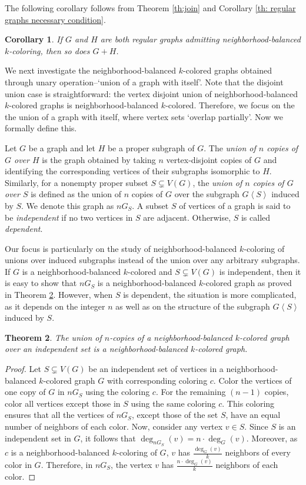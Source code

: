 \documentclass[12pt]{article}
\newtheorem{theorem}{Theorem}[section]
\newtheorem{corollary}[theorem]{Corollary}
\def\ni{\noindent}
\newcommand{\nbc}{neighborhood-balanced $k$-coloring\xspace}
\newcommand{\nbcd}{neighborhood-balanced $k$-colored\xspace}
\begin{document}
\ni The following corollary follows from Theorem \ref{th:join} and Corollary \ref{th: regular graphs necessary condition}.

\begin{corollary}
    If $G$ and $H$ are both regular graphs admitting \nbc, then so does $G+H$.
\end{corollary}

We next investigate the \nbcd graphs obtained through unary operation--`union of a graph with itself'.
Note that the disjoint union case is straightforward: the vertex disjoint union of \nbcd graphs is \nbcd.
Therefore, we focus on the the union of a graph with itself, where vertex sets `overlap partially'.
Now we formally define this.
\par
Let $G$ be a graph and let $H$ be a proper subgraph of $G$. 
The {\it union of $n$ copies of $G$ over $H$} is the graph obtained by taking $n$ vertex-disjoint copies of $G$ and identifying the corresponding vertices of their subgraphs isomorphic to $H$.
Similarly, for a nonempty proper subset $S \subsetneq V(G)$, the {\it union of $n$ copies of $G$ over $S$} is defined as the union of $n$ copies of $G$ over the subgraph $G\left< S \right>$ induced by $S$.
We denote this graph as $nG_S$.
A subset $S$ of vertices of a graph is said to be {\it independent} if no two vertices in $S$ are adjacent. 
Otherwise, $S$ is called {\it dependent}.
\par
Our focus is particularly on the study of \nbc of unions over induced subgraphs instead of the union over any arbitrary subgraphs.
If $G$ is a \nbcd and $S \subsetneq V(G)$ is independent, then it is easy to show that $nG_S$ is a \nbcd graph as proved in Theorem \ref{th:nGs}.
However, when $S$ is dependent, the situation is more complicated, as it depends on the integer $n$ as well as on the structure of the subgraph $G\left< S \right>$ induced by $S$.

\begin{theorem}\label{th:nGs}
The union of $n$-copies of a \nbcd graph over an independent set is a \nbcd graph. 
\end{theorem}
\begin{proof}
Let $S \subsetneq V(G)$ be an independent set of vertices in a neighborhood-balanced $k$-colored graph $G$ with corresponding coloring $c$.
Color the vertices of one copy of $G$ in $nG_S$ using the coloring $c$.
For the remaining $(n - 1)$ copies, color all vertices except those in $S$ using the same coloring $c$.
This coloring ensures that all the vertices of $nG_S$, except those of the set $S$, have an equal number of neighbors of each color.
Now, consider any vertex $v \in S$.
Since $S$ is an independent set in $G$, it follows that $\deg_{nG_S}(v) = n \cdot \deg_G(v)$.
Moreover, as $c$ is a neighborhood-balanced $k$-coloring of $G$, $v$ has $\frac{\deg_G(v)}{k}$ neighbors of every color in $G$.
Therefore, in $nG_S$, the vertex $v$ has $\frac{n \cdot \deg_G(v)}{k}$ neighbors of each color.
\end{proof}
\end{document}
